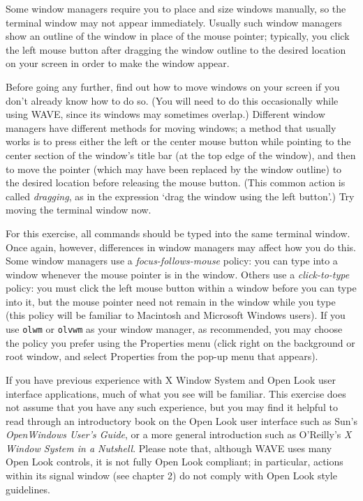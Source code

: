 \documentclass[twoside]{book}
\newcommand{\WAVE}{{\sf WAVE}\xspace}
\begin{document}
{\small
Some window managers require you to place and size windows manually,
so the terminal window may not appear immediately.  Usually such
window managers show an outline of the window in place of the mouse
pointer; typically, you click the left mouse button after dragging the
window outline to the desired location on your screen in order to make
the window appear.

Before going any further, find out how to move windows on your screen
if you don't already know how to do so.  (You will need to do this
occasionally while using \WAVE{}, since its windows may sometimes
overlap.)  Different window managers have different methods for moving
windows; a method that usually works is to press either the left or
the center mouse button while pointing to the center section of the
window's title bar (at the top edge of the window), and then to move
the pointer (which may have been replaced by the window outline) to
the desired location before releasing the mouse button.  (This common
action is called \emph{dragging}, as in the expression `drag the window
using the left button'.)  Try moving the terminal window now.

For this exercise, all commands should be typed into the same terminal window.
Once again, however, differences in window managers may affect how you do
this.  Some window managers use a \emph{focus-follows-mouse}
policy:  you can
type into a window whenever the mouse pointer is in the window.  Others use
a \emph{click-to-type}
policy:  you must click the left mouse button within
a window before you can type into it, but the mouse pointer need not remain
in the window while you type (this policy will be familiar to Macintosh and
Microsoft Windows users).  If you use {\tt olwm} or {\tt olvwm}
as your
window manager, as recommended, you may choose the policy you prefer using
the {\sf Properties} menu (click right on the background or root window,
and select {\sf Properties} from the pop-up menu that appears).

If you have previous experience with X Window System and Open Look
user interface applications, much of what you see will be familiar.
This exercise does not assume that you have any such experience, but
you may find it helpful to read through an introductory book on the
Open Look user interface
such as Sun's {\it OpenWindows User's Guide},
or a more general introduction such as O'Reilly's {\it X Window System
in a Nutshell}.  Please note that, although \WAVE{} uses many Open
Look controls, it is not fully Open Look compliant; in particular,
actions within its signal window (see chapter 2) do not comply with Open
Look style guidelines.}
\end{document}
